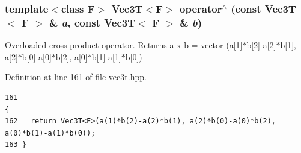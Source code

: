 \subsubsection{\setlength{\rightskip}{0pt plus 5cm}template$<$class F$>$ {\bf Vec3T}$<$F$>$ operator$^\wedge$ (const {\bf Vec3T}$<$ F $>$ \& {\em a}, const {\bf Vec3T}$<$ F $>$ \& {\em b})\hspace{0.3cm}{\tt  [inline]}}\label{vec3t_8hpp_d8144ac13e49f362e322dddb2a532c0f_d8144ac13e49f362e322dddb2a532c0f}


Overloaded cross product operator. Returns a x b = vector (a[1]$\ast$b[2]-a[2]$\ast$b[1], a[2]$\ast$b[0]-a[0]$\ast$b[2], a[0]$\ast$b[1]-a[1]$\ast$b[0]) 

Definition at line 161 of file vec3t.hpp.

\footnotesize\begin{verbatim}161                                                                                     {
162   return Vec3T<F>(a(1)*b(2)-a(2)*b(1), a(2)*b(0)-a(0)*b(2), a(0)*b(1)-a(1)*b(0)); 
163 }
\end{verbatim}\normalsize 


